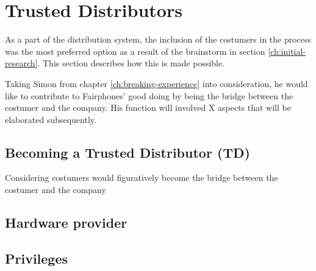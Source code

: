 \documentclass[final]{scrreprt} %
\begin{document}
\chapter{Trusted Distributors}
\label{ch:trusted-distributors}
As a part of the distribution system, the inclusion of the costumers in the process was the most preferred option as a result of the brainstorm in section \ref{ch:initial-research}. This section describes how this is made possible.

Taking Simon from chapter \ref{ch:breaking-experience} into consideration, he would like to contribute to Fairphones' good doing by being the bridge between the costumer and the company. His function will involved X aspects that will be elaborated subsequently.

\section{Becoming a Trusted Distributor (TD)}
Considering costumers would figuratively become the bridge between the costumer and the company



\section{Hardware provider}

\section{Privileges} 

\end{document}
